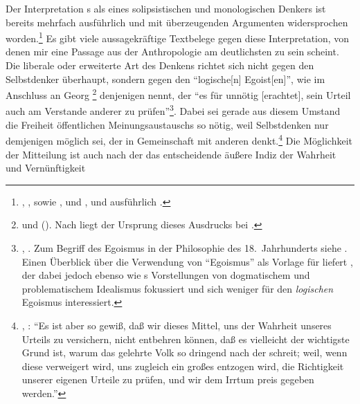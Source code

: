 \label{Abschnitt:KantunddieOeffentlichkeitderVernunft}Der
Interpretation s als eines solipsistischen und
monologischen Denkers ist bereits mehrfach ausführlich und mit überzeugenden
Argumenten widersprochen
worden.\footnote{\cite[Siehe][]{Hinske:PluralismusundPublikationsfreiheitimDenkenKants1986},
\cite{Hoeffe:EinerepublikanischeVernunft1996},
\cite{Recki:enquoteAnderStelle[je]desanderendenken2006} sowie \cite[][41,
56]{Wood:KantandtheProblemofHumanNature2003}, und
\cite[][325--328]{Pieper:EthikalsVerhaeltnisvonMoralphilosophieundAnthropologie1978},
und ausführlich
\cite{Keienburg:ImmanuelKantunddieOeffentlichkeitderVernunft2011}.} Es
gibt viele aussagekräftige Textbelege gegen diese Interpretation, von denen mir
eine Passage aus der Anthropologie am deutlichsten zu sein scheint. Die liberale oder
erweiterte Art des Denkens richtet sich nicht gegen den Selbstdenker überhaupt,
sondern gegen den \enquote{logische[n] Egoist[en]}, wie  im
Anschluss an Georg
\footnote{\cite[Vgl.][\S~202]{Meier:Vernunftlehre1752}
und \cite[][\S~170]{Meier:AuszugausderVernunftlehre1752} (\cite[][XVI:
413.29]{Kant:GesammelteWerke1900ff.}).
Nach \textcite[64]{Hinske:ZwischenAufklaerungundVernunftkritik1993} liegt der
Ursprung dieses Ausdrucks bei .} denjenigen
nennt, der \enquote{es für unnötig [erachtet], sein Urteil auch am Verstande
anderer zu
prüfen}\footnote{\cite[][BA~6]{Kant:AnthropologieinpragmatischerHinsicht1977},
\cite[VII: 128.31--32]{Kant:GesammelteWerke1900ff.}. Zum Begriff des Egoismus in
der Philosophie des 18.\ Jahrhunderts siehe
\cite[][200--227]{Halbfass:DescartesFragenachderExistenzderWelt1968}. Einen
 Überblick über die Verwendung von \enquote{Egoismus} als Vorlage für
  liefert
 \cite[][15--46]{Heidemann:KantunddasProblemdesmetaphysischenIdealismus1998},
 der dabei jedoch ebenso wie  s
 Vorstellungen von dogmatischem und problematischem Idealismus fokussiert und sich
weniger für den \emph{logischen} Egoismus interessiert.}. Dabei sei gerade aus
diesem Umstand die Freiheit öffentlichen Meinungsaustauschs so nötig, weil
Selbstdenken nur demjenigen möglich sei, der in Gemeinschaft mit anderen
denkt.\footnote{\cite[Vgl.][BA~6]{Kant:AnthropologieinpragmatischerHinsicht1977},
\cite[VII: 128.33--129.3]{Kant:GesammelteWerke1900ff.}: \enquote{Es ist aber so
gewiß, daß wir dieses Mittel, uns der Wahrheit unseres Urteils zu versichern,
nicht entbehren können, daß es vielleicht der wichtigste Grund ist, warum das
gelehrte Volk so dringend nach der  schreit; weil, wenn
diese verweigert wird, uns zugleich ein großes  entzogen wird, die
Richtigkeit unserer eigenen Urteile zu prüfen, und wir dem Irrtum preis gegeben
werden.}} Die Möglichkeit der Mitteilung ist auch nach der  das entscheidende äußere Indiz der Wahrheit und Vernünftigkeit
